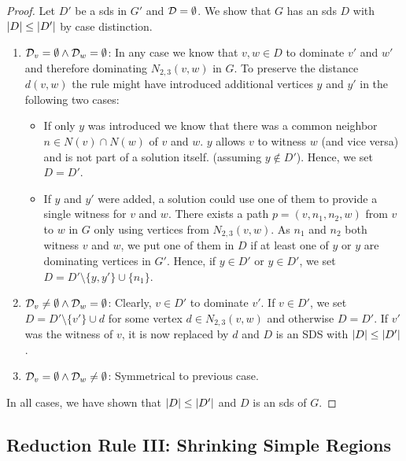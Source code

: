 \begin{proof}
    Let $D'$ be a sds in $G'$ and $\mathcal{D} =  \emptyset$. 
    We show that $G$ has an sds $D$ with $\abs{D} \leq \abs{D'}$ by case distinction. 
    \begin{enumerate}
        \item  $\mathcal{D}_{v} = \emptyset \wedge \mathcal{D}_{w} = \emptyset$: In any case we know that $v,w \in D$ to dominate $v'$ and $w'$ and therefore dominating $N_{2,3}(v,w)$ in $G$. 
        To preserve the distance $d(v,w)$ the rule might have introduced additional vertices $y$ and $y'$ in the following two cases:            
        \begin{itemize}
            \item If only $y$ was introduced we know that there was a common neighbor $n \in N(v) \cap N(w)$ of $v$ and $w$. $y$ allows $v$ to witness $w$ (and vice versa) and is not part of a solution itself. (assuming $y \notin D'$). Hence, we set $D = D'$.
            \item If $y$ and $y'$ were added, a solution could use one of them to provide a single witness for $v$ and $w$. There exists a path $p = (v, n_1, n_2, w)$ from $v$ to $w$ in $G$ only using vertices from $N_{2,3}(v,w)$. As $n_1$ and $n_2$ both witness $v$ and $w$, we put one of them in $D$ if at least one of $y$ or $y$ are dominating vertices in $G'$.
            Hence, if $y \in D'$ or $y \in D'$, we set $D = D' \setminus \{y,y'\} \cup \{n_1\}$.
        \end{itemize}
        \item  $\mathcal{D}_{v} \neq \emptyset \wedge \mathcal{D}_{w} = \emptyset$: Clearly, $v \in D'$ to dominate $v'$. If $v \in D'$, we set $D =  D' \setminus \{v'\} \cup d$ for some vertex $d \in N_{2,3}(v,w)$ and otherwise $D = D'$. If $v'$ was the witness of $v$, it is now replaced by $d$ and $D$ is an SDS with $\abs{D} \leq \abs{D'}$.
        \item  $\mathcal{D}_{v} = \emptyset \wedge \mathcal{D}_{w} \neq \emptyset$: Symmetrical to previous case.
    \end{enumerate} 
    In all cases, we have shown that $\abs{D} \leq \abs{D'}$ and $D$ is an sds of $G$.

\end{proof}



\subsection{Reduction Rule III: Shrinking Simple Regions}

